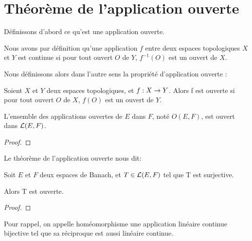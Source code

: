 \chapter{Théorème de l'application ouverte}

Définissons d'abord ce qu'est une application ouverte.

Nous avons par définition qu'une application $f$ entre deux espaces topologiques
$X$ et $Y$ est continue si pour tout ouvert $O$ de $Y$, $f^{-1}(O)$ est un
ouvert de $X$.

Nous définissons alors dans l'autre sens la propriété d'application ouverte :

\begin{definition}
	Soient $X$ et $Y$ deux espaces topologiques, et $f : X \rightarrow Y$. Alors
	f est ouverte si pour tout ouvert $O$ de $X$, $f(O)$ est un ouvert de $Y$.
\end{definition}


%

\begin{proposition}
	L'ensemble des applications ouvertes de $E$ dans $F$, noté $O(E, F)$, est
	ouvert dans $\mathcal{L}(E, F)$.
\end{proposition}

\begin{proof}

\end{proof}

Le théorème de l'application ouverte nous dit:

\begin{theorem} 
\label{theorem_open_application}
	Soit $E$ et $F$ deux espaces de Banach, et $T \in \mathcal{L}(E, F)$ tel
	que T est surjective.

	Alors T est ouverte.
\end{theorem}

\begin{proof}

\end{proof}

Pour rappel, on appelle homéomorphisme une application linéaire continue bijective
tel que sa réciproque est aussi linéaire continue.

